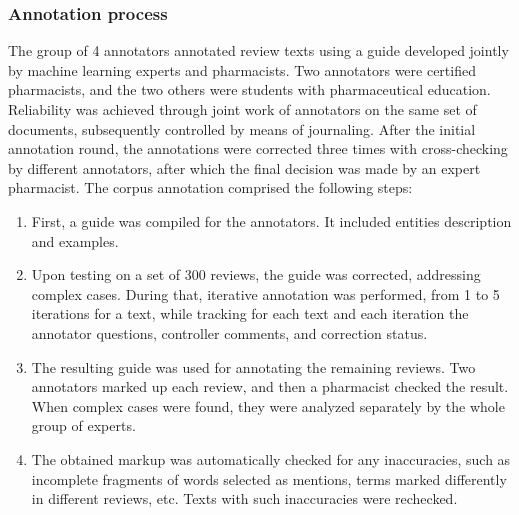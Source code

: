 \documentclass[a4paper,fleqn,longmktitle]{cas-dc}
\begin{document}
\subsubsection{Annotation process}\label{subsec:annotation_process}
The group of 4 annotators annotated  review texts using a guide developed jointly by machine learning experts and pharmacists. Two annotators were certified pharmacists, and the two others were students with pharmaceutical education. Reliability was achieved through joint work of annotators on the same set of documents, subsequently controlled by means of journaling. After the initial annotation round, the annotations were corrected three times with cross-checking by different annotators, after which the final decision was made by an expert pharmacist.
The corpus annotation comprised the following steps:
\begin{enumerate}
    \item First, a guide was compiled for the annotators. It included entities description and examples.
    \item Upon testing on a set of 300 reviews, the guide was corrected, addressing complex cases. During that, iterative annotation was performed, from 1 to 5 iterations for a text, while tracking for each text and each iteration the annotator questions, controller comments, and correction status.
    \item The resulting guide was used for annotating the remaining reviews. Two annotators marked up each review, and then a pharmacist checked the result. When complex cases were found, they were analyzed separately by the whole group of experts.
    \item The obtained markup was automatically checked for any inaccuracies, such as incomplete fragments of words selected as mentions, terms marked differently in different reviews, etc. Texts with such inaccuracies were rechecked.
\end{enumerate}
\end{document}
